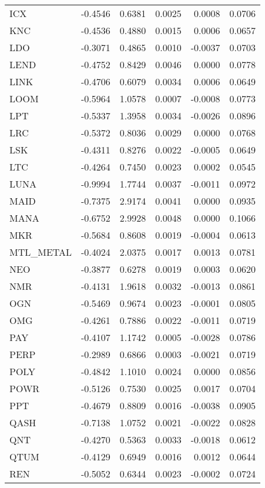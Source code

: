 \begin{table}[ht]
\begin{tabular}{lrrrrr}
ICX & -0.4546 & 0.6381 & 0.0025 & 0.0008 & 0.0706 \\
KNC & -0.4536 & 0.4880 & 0.0015 & 0.0006 & 0.0657 \\
LDO & -0.3071 & 0.4865 & 0.0010 & -0.0037 & 0.0703 \\
LEND & -0.4752 & 0.8429 & 0.0046 & 0.0000 & 0.0778 \\
LINK & -0.4706 & 0.6079 & 0.0034 & 0.0006 & 0.0649 \\
LOOM & -0.5964 & 1.0578 & 0.0007 & -0.0008 & 0.0773 \\
LPT & -0.5337 & 1.3958 & 0.0034 & -0.0026 & 0.0896 \\
LRC & -0.5372 & 0.8036 & 0.0029 & 0.0000 & 0.0768 \\
LSK & -0.4311 & 0.8276 & 0.0022 & -0.0005 & 0.0649 \\
LTC & -0.4264 & 0.7450 & 0.0023 & 0.0002 & 0.0545 \\
LUNA & -0.9994 & 1.7744 & 0.0037 & -0.0011 & 0.0972 \\
MAID & -0.7375 & 2.9174 & 0.0041 & 0.0000 & 0.0935 \\
MANA & -0.6752 & 2.9928 & 0.0048 & 0.0000 & 0.1066 \\
MKR & -0.5684 & 0.8608 & 0.0019 & -0.0004 & 0.0613 \\
MTL_METAL & -0.4024 & 2.0375 & 0.0017 & 0.0013 & 0.0781 \\
NEO & -0.3877 & 0.6278 & 0.0019 & 0.0003 & 0.0620 \\
NMR & -0.4131 & 1.9618 & 0.0032 & -0.0013 & 0.0861 \\
OGN & -0.5469 & 0.9674 & 0.0023 & -0.0001 & 0.0805 \\
OMG & -0.4261 & 0.7886 & 0.0022 & -0.0011 & 0.0719 \\
PAY & -0.4107 & 1.1742 & 0.0005 & -0.0028 & 0.0786 \\
PERP & -0.2989 & 0.6866 & 0.0003 & -0.0021 & 0.0719 \\
POLY & -0.4842 & 1.1010 & 0.0024 & 0.0000 & 0.0856 \\
POWR & -0.5126 & 0.7530 & 0.0025 & 0.0017 & 0.0704 \\
PPT & -0.4679 & 0.8809 & 0.0016 & -0.0038 & 0.0905 \\
QASH & -0.7138 & 1.0752 & 0.0021 & -0.0022 & 0.0828 \\
QNT & -0.4270 & 0.5363 & 0.0033 & -0.0018 & 0.0612 \\
QTUM & -0.4129 & 0.6949 & 0.0016 & 0.0012 & 0.0644 \\
REN & -0.5052 & 0.6344 & 0.0023 & -0.0002 & 0.0724 \\

\end{tabular}
\end{table}
